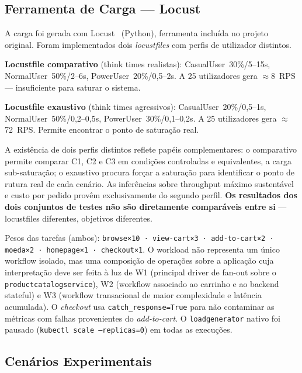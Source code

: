 \documentclass[acmsmall,screen=true,nonacm]{acmart}
\begin{document}
\subsection{Ferramenta de Carga — Locust}

A carga foi gerada com Locust~\cite{locust} (Python), ferramenta incluída no projeto original. Foram implementados dois \textit{locustfiles} com perfis de utilizador distintos.

\textbf{Locustfile comparativo} (think times realistas): CasualUser~30\%/5--15s, NormalUser~50\%/2--6s, PowerUser~20\%/0,5--2s. A 25 utilizadores gera $\approx$8~RPS — insuficiente para saturar o sistema.

\textbf{Locustfile exaustivo} (think times agressivos): CasualUser~20\%/0,5--1s, NormalUser~50\%/0,2--0,5s, PowerUser~30\%/0,1--0,2s. A 25 utilizadores gera $\approx$72~RPS. Permite encontrar o ponto de saturação real.

A existência de dois perfis distintos reflete papéis complementares: o comparativo permite comparar C1, C2 e C3 em condições controladas e equivalentes, a carga sub-saturação; o exaustivo procura forçar a saturação para identificar o ponto de rutura real de cada cenário. As inferências sobre throughput máximo sustentável e custo por pedido provêm exclusivamente do segundo perfil. \textbf{Os resultados dos dois conjuntos de testes não são diretamente comparáveis entre si} — locustfiles diferentes, objetivos diferentes.

Pesos das tarefas (ambos): \texttt{browse×10 · view-cart×3 · add-to-cart×2 · moeda×2 · homepage×1 · checkout×1}. O workload não representa um único workflow isolado, mas uma composição de operações sobre a aplicação cuja interpretação deve ser feita à luz de W1 (principal driver de fan-out sobre o \texttt{productcatalogservice}), W2 (workflow associado ao carrinho e ao backend stateful) e W3 (workflow transacional de maior complexidade e latência acumulada). O \textit{checkout} usa \texttt{catch\_response=True} para não contaminar as métricas com falhas provenientes do \textit{add-to-cart}. O \texttt{loadgenerator} nativo foi pausado (\texttt{kubectl scale --replicas=0}) em todas as execuções.

\subsection{Cenários Experimentais}
\end{document}
